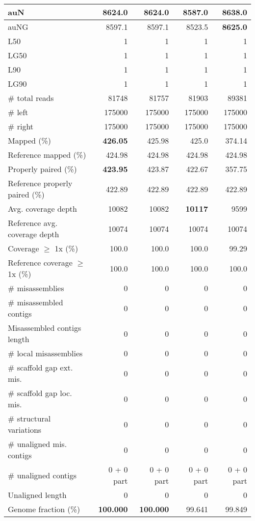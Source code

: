 \documentclass[12pt,a4paper]{article}
\begin{document}
\begin{table}[ht]
\begin{center}
\begin{tabular}{|l*{4}{|r}|}
auN & 8624.0 & 8624.0 & 8587.0 & {\bf 8638.0} \\ \hline
auNG & 8597.1 & 8597.1 & 8523.5 & {\bf 8625.0} \\ \hline
L50 & 1 & 1 & 1 & 1 \\ \hline
LG50 & 1 & 1 & 1 & 1 \\ \hline
L90 & 1 & 1 & 1 & 1 \\ \hline
LG90 & 1 & 1 & 1 & 1 \\ \hline
\# total reads & 81748 & 81757 & 81903 & 89381 \\ \hline
\# left & 175000 & 175000 & 175000 & 175000 \\ \hline
\# right & 175000 & 175000 & 175000 & 175000 \\ \hline
Mapped (\%) & {\bf 426.05} & 425.98 & 425.0 & 374.14 \\ \hline
Reference mapped (\%) & 424.98 & 424.98 & 424.98 & 424.98 \\ \hline
Properly paired (\%) & {\bf 423.95} & 423.87 & 422.67 & 357.75 \\ \hline
Reference properly paired (\%) & 422.89 & 422.89 & 422.89 & 422.89 \\ \hline
Avg. coverage depth & 10082 & 10082 & {\bf 10117} & 9599 \\ \hline
Reference avg. coverage depth & 10074 & 10074 & 10074 & 10074 \\ \hline
Coverage $\geq$ 1x (\%) & 100.0 & 100.0 & 100.0 & 99.29 \\ \hline
Reference coverage $\geq$ 1x (\%) & 100.0 & 100.0 & 100.0 & 100.0 \\ \hline
\# misassemblies & 0 & 0 & 0 & 0 \\ \hline
\# misassembled contigs & 0 & 0 & 0 & 0 \\ \hline
Misassembled contigs length & 0 & 0 & 0 & 0 \\ \hline
\# local misassemblies & 0 & 0 & 0 & 0 \\ \hline
\# scaffold gap ext. mis. & 0 & 0 & 0 & 0 \\ \hline
\# scaffold gap loc. mis. & 0 & 0 & 0 & 0 \\ \hline
\# structural variations & 0 & 0 & 0 & 0 \\ \hline
\# unaligned mis. contigs & 0 & 0 & 0 & 0 \\ \hline
\# unaligned contigs & 0 + 0 part & 0 + 0 part & 0 + 0 part & 0 + 0 part \\ \hline
Unaligned length & 0 & 0 & 0 & 0 \\ \hline
Genome fraction (\%) & {\bf 100.000} & {\bf 100.000} & 99.641 & 99.849 \\ \hline

\end{tabular}
\end{center}
\end{table}
\end{document}
